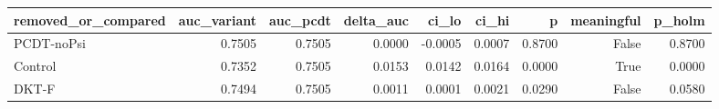 \begin{tabular}{lrrrrrrrr}
\toprule
removed\_or\_compared & auc\_variant & auc\_pcdt & delta\_auc & ci\_lo & ci\_hi & p & meaningful & p\_holm \\
\midrule
PCDT-noPsi & 0.7505 & 0.7505 & 0.0000 & -0.0005 & 0.0007 & 0.8700 & False & 0.8700 \\
Control & 0.7352 & 0.7505 & 0.0153 & 0.0142 & 0.0164 & 0.0000 & True & 0.0000 \\
DKT-F & 0.7494 & 0.7505 & 0.0011 & 0.0001 & 0.0021 & 0.0290 & False & 0.0580 \\
\bottomrule
\end{tabular}

